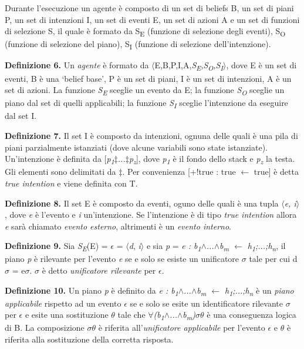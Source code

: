 \bigskip
Durante l'esecuzione un agente \`e composto di un set di beliefs B, un set di piani P, un set di intenzioni I, un set di eventi E, un set di azioni A e un set di funzioni di selezione S, il quale \`e formato da S\textsubscript{E} (funzione di selezione degli eventi), S\textsubscript{O} (funzione di selezione del piano), S\textsubscript{I} (funzione di selezione dell'intenzione).

\smallskip
\textbf{Definizione 6.} Un \textit{agente} \`e formato da $\langle$E,B,P,I,A,\textit{S\textsubscript{E},S\textsubscript{O},S\textsubscript{I}}$\rangle$, dove E \`e un set di eventi, B \`e una `belief base', P \`e un set di piani, I \`e un set di intenzioni, A \`e un set di azioni. La funzione \textit{S\textsubscript{E}} sceglie un evento da E; la funzione \textit{S\textsubscript{O}} sceglie un piano dal set di quelli applicabili; la funzione \textit{S\textsubscript{I}} sceglie l'intenzione da eseguire dal set I.

\smallskip
\textbf{Definizione 7.} Il set I \`e composto da intenzioni, ognuna delle quali \`e una pila di piani parzialmente istanziati (dove alcune variabili sono state istanziate). Un'intenzione \`e definita da [\textit{p\textsubscript{1}$\ddagger$...$\ddagger$p\textsubscript{z}}], dove \textit{p\textsubscript{1}} \`e il fondo dello stack e \textit{p\textsubscript{z}} la testa. Gli elementi sono delimitati da $\ddagger$. Per convenienza [+!true : true $\leftarrow$ true] \`e detta \textit{true intention} e viene definita con T.

\smallskip
\textbf{Definizione 8.} Il set E \`e composto da eventi, oguno delle quali \`e una tupla \textit{$\langle$\textit{e}, \textit{i}$\rangle$}, dove \textit{e} \`e l'evento e \textit{i} un'intenzione. Se l'intenzione \`e di tipo \textit{true intention} allora \textit{e} sar\`a chiamato \textit{evento esterno}, altrimenti \`e un \textit{evento interno}.

\smallskip
\textbf{Definizione 9.} Sia \textit{S\textsubscript{E}}(E) = \textit{$\epsilon$} = $\langle$\textit{d}, \textit{i}$\rangle$ e sia \textit{p} = \textit{e : b\textsubscript{1}$\land$...$\land$b\textsubscript{m} $\leftarrow$ h\textsubscript{1};...;h\textsubscript{n}}, il piano \textit{p} \`e rilevante per l'evento \textit{e} se e solo se esiste un unificatore $\sigma$ tale per cui d$\sigma$ = e$\sigma$. \textit{$\sigma$} \`e detto \textit{unificatore rilevante} per \textit{$\epsilon$}.

\smallskip
\textbf{Definizione 10.} Un piano \textit{p} \`e definito da \textit{e : b\textsubscript{1}$\land$...$\land$b\textsubscript{m} $\leftarrow$ h\textsubscript{1};...;h\textsubscript{n}} \`e un \textit{piano applicabile} rispetto ad un evento \textit{$\epsilon$} se e solo se esite un identificatore rilevante $\sigma$ per \textit{$\epsilon$} e esite una sostituzione \textit{$\theta$} tale che $\forall$\textit{(b\textsubscript{1}$\land$...$\land$b\textsubscript{m})}\textit{$\sigma\theta$} \`e una conseguenza logica di B. La composizione \textit{$\sigma\theta$} \`e riferita all'\textit{unificatore applicabile} per l'evento \textit{$\epsilon$} e \textit{$\theta$} \`e riferita alla sostituzione della corretta risposta.



